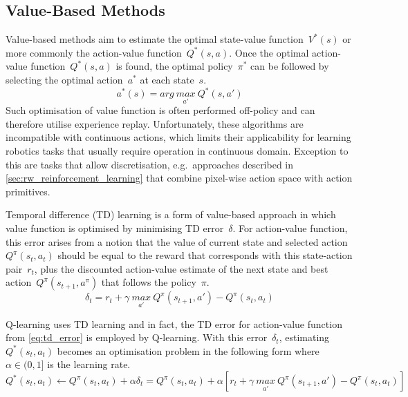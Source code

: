 \subsection{Value-Based Methods}\label{subsec:bg_value_based_methods}

Value-based methods aim to estimate the optimal state-value function~\(V^{*}(s)\) or more commonly the action-value function~\(Q^{*}(s, a)\). Once the optimal action-value function~\(Q^{*}(s, a)\) is found, the optimal policy~\(\pi^{*}\) can be followed by selecting the optimal action~\(a^{*}\) at each state~\(s\).
\begin{equation}
    a^{*}(s) = arg\ \underset{a'}{max}\ Q^{*}(s, a')
    \label{eq:value_based_optimal_action_selection}
\end{equation}
Such optimisation of value function is often performed off-policy and can therefore utilise experience replay. Unfortunately, these algorithms are incompatible with continuous actions, which limits their applicability for learning robotics tasks that usually require operation in continuous domain. Exception to this are tasks that allow discretisation, e.g.~approaches described in \autoref{sec:rw_reinforcement_learning} that combine pixel-wise action space with action primitives.

Temporal difference (TD) learning is a form of value-based approach in which value function is optimised by minimising TD error~\(\delta\). For action-value function, this error arises from a notion that the value of current state and selected action~\(Q^{\pi}(s_{t}, a_{t})\) should be equal to the reward that corresponds with this state-action pair~\(r_{t}\), plus the discounted action-value estimate of the next state and best action~\(Q^{\pi}(s_{t+1}, a^{\pi})\) that follows the policy~\(\pi\).
\begin{equation}
    \delta_{t} = r_{t} + \gamma\ \underset{a'}{max}\ Q^{\pi}(s_{t+1}, a') - Q^{\pi}(s_{t}, a_{t})
    \label{eq:td_error}
\end{equation}

Q-learning uses TD learning and in fact, the TD error for action-value function from \autoref{eq:td_error} is employed by Q-learning. With this error~\(\delta_{t}\), estimating~\(Q^{*}(s_{t}, a_{t})\) becomes an optimisation problem in the following form where~\(\alpha \in (0, 1]\) is the learning rate.
\begin{equation}
    Q^{*}(s_{t}, a_{t}) \leftarrow Q^{\pi}(s_{t}, a_{t}) + \alpha\delta_{t} = Q^{\pi}(s_{t}, a_{t}) + \alpha \left[ r_{t} + \gamma\ \underset{a'}{max}\ Q^{\pi}(s_{t+1}, a') - Q^{\pi}(s_{t}, a_{t}) \right]
    \label{eq:q_learning}
\end{equation}

